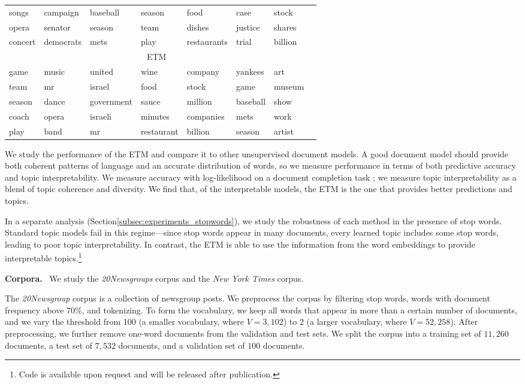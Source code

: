 \documentclass[11pt,a4paper]{article}
\DeclareRobustCommand{\parhead}[1]{\noindent\textbf{#1}~}
\begin{document}
\begin{table*}[t]
\begin{tabular}{llllllll}
     songs & campaign & baseball & season & food &  case & stock \\
     opera & senator & season & team & dishes &  justice & shares \\
     concert & democrats & mets & play & restaurants &  trial & billion  \\
\midrule 
\multicolumn{7}{c}{\gls{ETM}}\\
\hline
     game & music & united & wine & company & yankees &  art\\
     team & mr & israel & food & stock & game & museum    \\
     season & dance & government & sauce &  million & baseball & show \\
     coach & opera & israeli & minutes & companies & mets &  work \\
     play &  band & mr &  restaurant & billion &  season & artist  \\
 \bottomrule
 \end{tabular}
\label{tab:topics}
\end{table*}

We study the performance of the \gls{ETM} and compare it to other
unsupervised document models.  A good document model should provide
both coherent patterns of language and an accurate distribution of
words, so we measure performance in terms of both predictive accuracy
and topic interpretability.  We measure accuracy with log-likelihood
on a document completion task \citep{rosenzvi2004author,wallach2009evaluation};
we measure topic interpretability as a
blend of topic coherence and diversity.  We find that, of the interpretable
models, the \gls{ETM} is the one that provides better predictions and
topics.

In a separate analysis (Section\nobreakspace \ref {subsec:experiments_stopwords}), we study
the robustness of each method in the presence of stop words. Standard
topic models fail in this regime---since stop words appear in many documents,
every learned topic includes some stop words, leading to poor topic
interpretability.
In contrast, the \gls{ETM} is able to use the information from the word
embeddings to provide interpretable topics.\footnote{Code is available upon request and will be released after publication.}

\parhead{Corpora.} We study the \emph{20Newsgroups} corpus and the
\emph{New York Times} corpus.

The \emph{20Newsgroup} corpus is a collection of newsgroup posts. We
preprocess the corpus by filtering stop words, words with document
frequency above 70\%, and tokenizing.  To form the vocabulary, we keep
all words that appear in more than a certain number of documents, and
we vary the threshold from 100 (a smaller vocabulary, where
$V = 3{,}102$) to 2 (a larger vocabulary, where $V=52{,}258$). After
preprocessing, we further remove one-word documents from the
validation and test sets.
We split the corpus into a training set of $11{,}260$ documents, a test
set of $7{,}532$ documents, and a validation set of $100$ documents.
\end{document}
